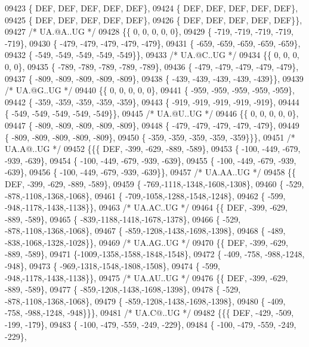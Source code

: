 \begin{DoxyCode}
09423 \{  DEF,  DEF,  DEF,  DEF,  DEF\},
09424 \{  DEF,  DEF,  DEF,  DEF,  DEF\},
09425 \{  DEF,  DEF,  DEF,  DEF,  DEF\},
09426 \{  DEF,  DEF,  DEF,  DEF,  DEF\}\},
09427 \textcolor{comment}{/* UA.@A..UG */}
09428 \{\{    0,    0,    0,    0,    0\},
09429 \{ -719, -719, -719, -719, -719\},
09430 \{ -479, -479, -479, -479, -479\},
09431 \{ -659, -659, -659, -659, -659\},
09432 \{ -549, -549, -549, -549, -549\}\},
09433 \textcolor{comment}{/* UA.@C..UG */}
09434 \{\{    0,    0,    0,    0,    0\},
09435 \{ -789, -789, -789, -789, -789\},
09436 \{ -479, -479, -479, -479, -479\},
09437 \{ -809, -809, -809, -809, -809\},
09438 \{ -439, -439, -439, -439, -439\}\},
09439 \textcolor{comment}{/* UA.@G..UG */}
09440 \{\{    0,    0,    0,    0,    0\},
09441 \{ -959, -959, -959, -959, -959\},
09442 \{ -359, -359, -359, -359, -359\},
09443 \{ -919, -919, -919, -919, -919\},
09444 \{ -549, -549, -549, -549, -549\}\},
09445 \textcolor{comment}{/* UA.@U..UG */}
09446 \{\{    0,    0,    0,    0,    0\},
09447 \{ -809, -809, -809, -809, -809\},
09448 \{ -479, -479, -479, -479, -479\},
09449 \{ -809, -809, -809, -809, -809\},
09450 \{ -359, -359, -359, -359, -359\}\}\},
09451 \textcolor{comment}{/* UA.A@..UG */}
09452 \{\{\{  DEF, -399, -629, -889, -589\},
09453 \{ -100, -449, -679, -939, -639\},
09454 \{ -100, -449, -679, -939, -639\},
09455 \{ -100, -449, -679, -939, -639\},
09456 \{ -100, -449, -679, -939, -639\}\},
09457 \textcolor{comment}{/* UA.AA..UG */}
09458 \{\{  DEF, -399, -629, -889, -589\},
09459 \{ -769,-1118,-1348,-1608,-1308\},
09460 \{ -529, -878,-1108,-1368,-1068\},
09461 \{ -709,-1058,-1288,-1548,-1248\},
09462 \{ -599, -948,-1178,-1438,-1138\}\},
09463 \textcolor{comment}{/* UA.AC..UG */}
09464 \{\{  DEF, -399, -629, -889, -589\},
09465 \{ -839,-1188,-1418,-1678,-1378\},
09466 \{ -529, -878,-1108,-1368,-1068\},
09467 \{ -859,-1208,-1438,-1698,-1398\},
09468 \{ -489, -838,-1068,-1328,-1028\}\},
09469 \textcolor{comment}{/* UA.AG..UG */}
09470 \{\{  DEF, -399, -629, -889, -589\},
09471 \{-1009,-1358,-1588,-1848,-1548\},
09472 \{ -409, -758, -988,-1248, -948\},
09473 \{ -969,-1318,-1548,-1808,-1508\},
09474 \{ -599, -948,-1178,-1438,-1138\}\},
09475 \textcolor{comment}{/* UA.AU..UG */}
09476 \{\{  DEF, -399, -629, -889, -589\},
09477 \{ -859,-1208,-1438,-1698,-1398\},
09478 \{ -529, -878,-1108,-1368,-1068\},
09479 \{ -859,-1208,-1438,-1698,-1398\},
09480 \{ -409, -758, -988,-1248, -948\}\}\},
09481 \textcolor{comment}{/* UA.C@..UG */}
09482 \{\{\{  DEF, -429, -509, -199, -179\},
09483 \{ -100, -479, -559, -249, -229\},
09484 \{ -100, -479, -559, -249, -229\},

\end{DoxyCode}
